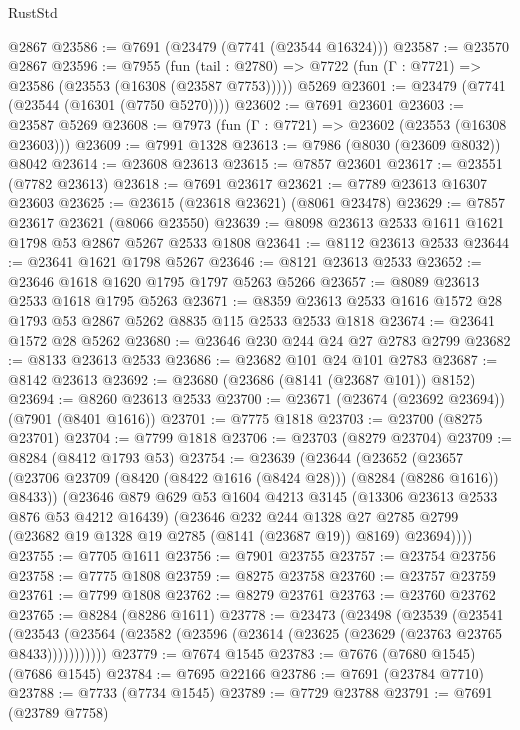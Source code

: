 \begin{lexlean}{RustStd}
\begin{coremodule}
    @2867
@23586 := @7691 (@23479 (@7741 (@23544 @16324)))
@23587 := @23570 @2867
@23596 := @7955
    (fun (tail : @2780) => @7722 (fun (Γ : @7721) => @23586 (@23553 (@16308 (@23587 @7753)))))
    @5269
@23601 := @23479 (@7741 (@23544 (@16301 (@7750 @5270))))
@23602 := @7691 @23601
@23603 := @23587 @5269
@23608 := @7973 (fun (Γ : @7721) => @23602 (@23553 (@16308 @23603)))
@23609 := @7991 @1328
@23613 := @7986 (@8030 (@23609 @8032)) @8042
@23614 := @23608 @23613
@23615 := @7857 @23601
@23617 := @23551 (@7782 @23613)
@23618 := @7691 @23617
@23621 := @7789 @23613 @16307 @23603
@23625 := @23615 (@23618 @23621) (@8061 @23478)
@23629 := @7857 @23617 @23621 (@8066 @23550)
@23639 := @8098 @23613 @2533 @1611 @1621 @1798 @53 @2867 @5267 @2533 @1808
@23641 := @8112 @23613 @2533
@23644 := @23641 @1621 @1798 @5267
@23646 := @8121 @23613 @2533
@23652 := @23646 @1618 @1620 @1795 @1797 @5263 @5266
@23657 := @8089 @23613 @2533 @1618 @1795 @5263
@23671 := @8359 @23613 @2533 @1616 @1572 @28 @1793 @53 @2867 @5262 @8835 @115 @2533 @2533 @1818
@23674 := @23641 @1572 @28 @5262
@23680 := @23646 @230 @244 @24 @27 @2783 @2799
@23682 := @8133 @23613 @2533
@23686 := @23682 @101 @24 @101 @2783
@23687 := @8142 @23613
@23692 := @23680 (@23686 (@8141 (@23687 @101)) @8152)
@23694 := @8260 @23613 @2533
@23700 := @23671 (@23674 (@23692 @23694)) (@7901 (@8401 @1616))
@23701 := @7775 @1818
@23703 := @23700 (@8275 @23701)
@23704 := @7799 @1818
@23706 := @23703 (@8279 @23704)
@23709 := @8284 (@8412 @1793 @53)
@23754 := @23639
    (@23644
      (@23652
        (@23657 (@23706 @23709 (@8420 (@8422 @1616 (@8424 @28))) (@8284 (@8286 @1616)) @8433))
        (@23646
          @879
          @629
          @53
          @1604
          @4213
          @3145
          (@13306 @23613 @2533 @876 @53 @4212 @16439)
          (@23646
            @232
            @244
            @1328
            @27
            @2785
            @2799
            (@23682 @19 @1328 @19 @2785 (@8141 (@23687 @19)) @8169)
            @23694))))
@23755 := @7705 @1611
@23756 := @7901 @23755
@23757 := @23754 @23756
@23758 := @7775 @1808
@23759 := @8275 @23758
@23760 := @23757 @23759
@23761 := @7799 @1808
@23762 := @8279 @23761
@23763 := @23760 @23762
@23765 := @8284 (@8286 @1611)
@23778 := @23473
    (@23498
      (@23539
        (@23541
          (@23543 (@23564 (@23582 (@23596 (@23614 (@23625 (@23629 (@23763 @23765 @8433)))))))))))
@23779 := @7674 @1545
@23783 := @7676 (@7680 @1545) (@7686 @1545)
@23784 := @7695 @22166
@23786 := @7691 (@23784 @7710)
@23788 := @7733 (@7734 @1545)
@23789 := @7729 @23788
@23791 := @7691 (@23789 @7758)

\end{coremodule}
\end{lexlean}
